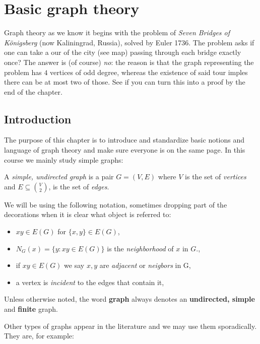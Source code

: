 \chapter{Basic graph theory}

Graph theory as we know it begins with the problem of \textit{Seven Bridges of K\"onigsberg} (now Kaliningrad, Russia), solved by Euler 1736. The problem asks if one can take a our of the city (see map) passing through each bridge exactly once? The answer is (of course) \emph{no}: the reason is that the graph representing the problem has $4$ vertices of odd degree, whereas the existence of said tour imples there can be at most two of those. See if you can turn this into a proof by the end of the chapter.

\section{Introduction}

The purpose of this chapter is to introduce and standardize basic notions and language of graph theory and make sure everyone is on the same page. In this course we mainly study simple graphs:

\begin{definition}
A \emph{simple, undirected graph} is a pair $G=(V,E)$ where $V$ is the set of \emph{vertices} and 
$E \subseteq {V\choose 2}$, is the set of \emph{edges}. 
\end{definition}

We will be using the following notation, sometimes dropping part of the decorations when it is clear what object is referred to:

\begin{itemize}
    \item $xy\in E(G)$ for $\{x,y\}\in E(G)$,
    \item $N_G(x)=\{y: xy\in E(G)\}$ is the \emph{neighborhood} of $x$ in $G$.,
    \item if $xy\in E(G)$ we say $x,y$ are \emph{adjacent} or \emph{neigbors} in G,
    \item a vertex is \emph{incident} to the edges that contain it,
\end{itemize}

Unless otherwise noted, the word \textbf{graph} always denotes an \textbf{undirected, simple} and \textbf{finite} graph.

Other types of graphs appear in the literature and we may use them sporadically. They are, for example:

